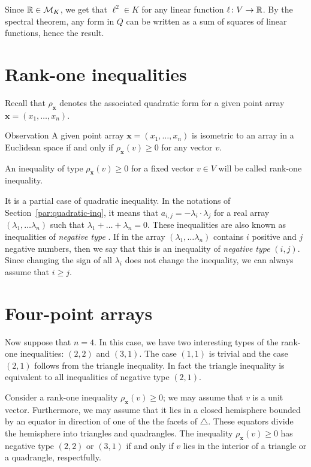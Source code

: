 \documentclass[a4paper,10pt]{article}
\begin{document}
Since $\mathbb{R}\in \mathcal{M}_K$, we get that $\ell^2\in K$ for any linear function $\ell\colon V\to\mathbb{R}$.
By the spectral theorem, any form in $Q$ can be written as a sum of squares of linear functions, hence the result.
\qeds

\section{Rank-one inequalities}\label{par:rank-one}
Recall that $\rho_{\bm{x}}$ denotes the associated quadratic form for a given point array $\bm{x}=(x_1,\dots,x_n)$.

\begin{thm}{Observation}\label{obs:rank-one}
A given point array $\bm{x}=(x_1,\dots,x_n)$ is isometric to an array in a Euclidean space if and only if $\rho_{\bm{x}}(v)\ge 0$ for any vector $v$.
\end{thm}

An inequality of type $\rho_{\bm{x}}(v)\ge 0$ for a fixed vector $v\in V$ will be called rank-one inequality.

It is a partial case of quadratic inequality.
In the notations of Section~\ref{par:quadratic-inq}, it means that $a_{i,j}=-\lambda_i\cdot\lambda_j$ for a real array $(\lambda_1,\dots \lambda_n)$ such that
$\lambda_1+\dots+\lambda_n=0$.
These inequalities are also known as inequalities of \emph{negative type} \cite{deza-lauren}.
If in the array $(\lambda_1,\dots \lambda_n)$ contains $i$ positive and $j$ negative numbers,
then we say that this is an inequality of \emph{negative type} $(i,j)$.
Since changing the sign of all $\lambda_i$ does not change the inequality, we can always assume that $i\ge j$.

\section{Four-point arrays}\label{Four-point arrays}
Now suppose that $n=4$.
In this case, we have two interesting types of the rank-one inequalities: $(2,2)$ and $(3,1)$.
The case $(1,1)$ is trivial and 
the case $(2,1)$ follows from the triangle inequality.
In fact the triangle inequality is equivalent to all inequalities of negative type $(2,1)$.

Consider a rank-one inequality $\rho_{\bm{x}}(v)\ge 0$; we may assume that $v$ is a unit vector.
Furthermore, we may assume that it lies in a closed hemisphere bounded by an equator in direction of one of the the facets of $\triangle$.
These equators divide the hemisphere into triangles and quadrangles.
The inequality $\rho_{\bm{x}}(v)\ge 0$ has negative type $(2,2)$ or $(3,1)$
if and only if $v$ lies in the interior of a triangle or a quadrangle, respectfully.
\end{document}
